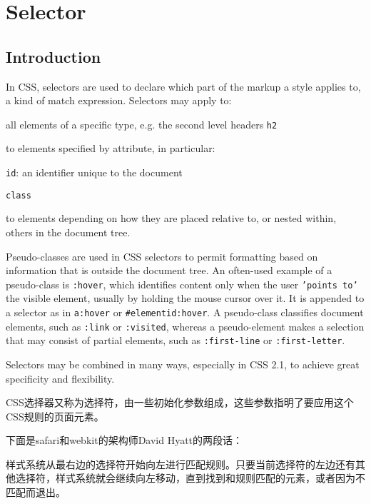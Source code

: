 \chapter{Selector}


\section{Introduction}


In CSS, selectors are used to declare which part of the markup a style applies to, a kind of match expression. Selectors may apply to:

\begin{compactitem}
\item all elements of a specific type, e.g. the second level headers \texttt{h2}
\item to elements specified by attribute, in particular:
	\begin{compactitem}[$\circ$]
	\item \texttt{id}: an identifier unique to the document
	\item \texttt{class}
	\end{compactitem}
\item to elements depending on how they are placed relative to, or nested within, others in the document tree.
\end{compactitem}

Pseudo-classes are used in CSS selectors to permit formatting based on information that is outside the document tree. An often-used example of a pseudo-class is \texttt{:hover}, which identifies content only when the user \texttt{'points to'} the visible element, usually by holding the mouse cursor over it. It is appended to a selector as in \texttt{a:hover} or \texttt{\#elementid:hover}. A pseudo-class classifies document elements, such as \texttt{:link} or \texttt{:visited}, whereas a pseudo-element makes a selection that may consist of partial elements, such as \texttt{:first-line} or \texttt{:first-letter}.

Selectors may be combined in many ways, especially in CSS 2.1, to achieve great specificity and flexibility.

CSS选择器又称为选择符，由一些初始化参数组成，这些参数指明了要应用这个CSS规则的页面元素。


下面是safari和webkit的架构师David Hyatt的两段话\cite{aliued_css_selector}：

\begin{shaded}
\noindent 样式系统从最右边的选择符开始向左进行匹配规则。只要当前选择符的左边还有其他选择符，样式系统就会继续向左移动，直到找到和规则匹配的元素，或者因为不匹配而退出。
\end{shaded}

